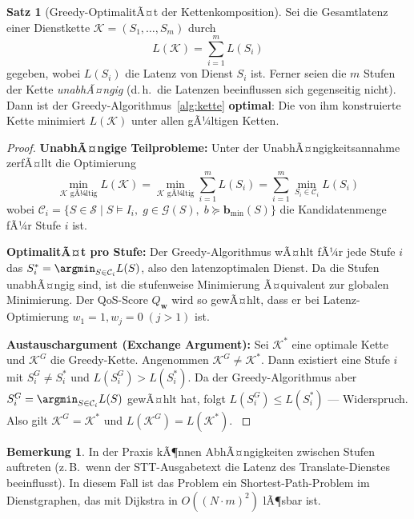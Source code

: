 ﻿\documentclass[a4paper,12pt]{article}
\theoremstyle{definition}
\newtheorem{satz}{Satz}
\newtheorem{bemerkung}{Bemerkung}
\begin{document}
\begin{satz}[Greedy-OptimalitÃ¤t der Kettenkomposition]
\label{satz:optimalitaet_kette}
Sei die Gesamtlatenz einer Dienstkette $\mathcal{K} = (S_1, \ldots, S_m)$ durch
\[
L(\mathcal{K}) = \sum_{i=1}^m L(S_i)
\]
gegeben, wobei $L(S_i)$ die Latenz von Dienst $S_i$ ist. Ferner seien die $m$ Stufen der Kette \emph{unabhÃ¤ngig} (d.\,h.\ die Latenzen beeinflussen sich gegenseitig nicht). Dann ist der Greedy-Algorithmus~\ref{alg:kette} \textbf{optimal}: Die von ihm konstruierte Kette minimiert $L(\mathcal{K})$ unter allen gÃ¼ltigen Ketten.
\end{satz}

\begin{proof}
\textbf{UnabhÃ¤ngige Teilprobleme:} Unter der UnabhÃ¤ngigkeitsannahme zerfÃ¤llt die Optimierung
\[
\min_{\mathcal{K} \text{ gÃ¼ltig}} L(\mathcal{K}) = \min_{\mathcal{K} \text{ gÃ¼ltig}} \sum_{i=1}^m L(S_i) = \sum_{i=1}^m \min_{S_i \in \mathcal{C}_i} L(S_i)
\]
wobei $\mathcal{C}_i = \{S \in \mathcal{S} \mid S \models I_i,\; g \in \mathcal{G}(S),\; b \succeq \mathbf{b}_{\min}(S)\}$ die Kandidatenmenge fÃ¼r Stufe $i$ ist.

\textbf{OptimalitÃ¤t pro Stufe:} Der Greedy-Algorithmus wÃ¤hlt fÃ¼r jede Stufe $i$ das $S_i^* = \argmin_{S \in \mathcal{C}_i} L(S)$, also den latenzoptimalen Dienst. Da die Stufen unabhÃ¤ngig sind, ist die stufenweise Minimierung Ã¤quivalent zur globalen Minimierung. Der QoS-Score $Q_{\mathbf{w}}$ wird so gewÃ¤hlt, dass er bei Latenz-Optimierung $w_1 = 1, w_j = 0\; (j > 1)$ ist.

\textbf{Austauschargument (Exchange Argument):} Sei $\mathcal{K}^*$ eine optimale Kette und $\mathcal{K}^G$ die Greedy-Kette. Angenommen $\mathcal{K}^G \neq \mathcal{K}^*$. Dann existiert eine Stufe $i$ mit $S_i^G \neq S_i^*$ und $L(S_i^G) > L(S_i^*)$. Da der Greedy-Algorithmus aber $S_i^G = \argmin_{S \in \mathcal{C}_i} L(S)$ gewÃ¤hlt hat, folgt $L(S_i^G) \leq L(S_i^*)$ --- Widerspruch. Also gilt $\mathcal{K}^G = \mathcal{K}^*$ und $L(\mathcal{K}^G) = L(\mathcal{K}^*)$. $
$
\end{proof}

\begin{bemerkung}
In der Praxis kÃ¶nnen AbhÃ¤ngigkeiten zwischen Stufen auftreten (z.\,B.\ wenn der STT-Ausgabetext die Latenz des Translate-Dienstes beeinflusst). In diesem Fall ist das Problem ein Shortest-Path-Problem im Dienstgraphen, das mit Dijkstra in $O((N \cdot m)^2)$ lÃ¶sbar ist.
\end{bemerkung}
\end{document}
